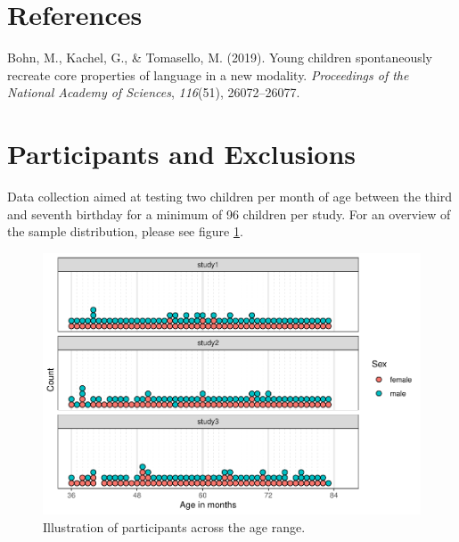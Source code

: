 \documentclass[
  man]{apa6}
\newlength{\cslhangindent}
\newenvironment{CSLReferences}[2] %
 {\begin{list}{}{%
  \setlength{\itemindent}{0pt}
  \setlength{\leftmargin}{0pt}
  \setlength{\parsep}{0pt}
  \ifodd #1
   \setlength{\leftmargin}{\cslhangindent}
   \setlength{\itemindent}{-1\cslhangindent}
  \fi
  \setlength{\itemsep}{#2\baselineskip}}}
 {\end{list}}
\begin{document}
\section{References}\label{references}

\label{refs}
\begin{CSLReferences}{1}{0}
Bohn, M., Kachel, G., \& Tomasello, M. (2019). Young children spontaneously recreate core properties of language in a new modality. \emph{Proceedings of the National Academy of Sciences}, \emph{116}(51), 26072--26077.

\end{CSLReferences}

\newpage

\appendix


\section{Participants and Exclusions}\label{participants-and-exclusions}

Data collection aimed at testing two children per month of age between the third and seventh birthday for a minimum of 96 children per study. For an overview of the sample distribution, please see figure \ref{fig:suppl-participants-dots}.

\begin{figure}

{\centering \includegraphics{symlit_rep_manuscript_files/figure-latex/suppl-participants-dots-1} 

}

\caption{Illustration of participants across the age range.}\label{fig:suppl-participants-dots}
\end{figure}
\end{document}
